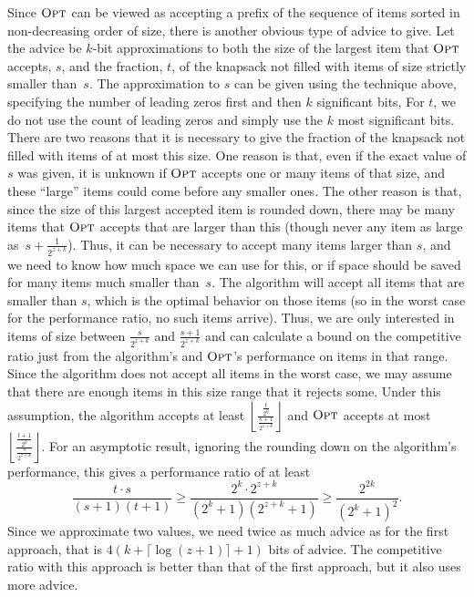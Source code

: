 \documentclass[a4paper,UKenglish,cleveref, autoref, thm-restate]{lipics-v2021}
\newcommand{\OPT}{\ensuremath{\operatorname{\textsc{Opt}}}\xspace}
\newcommand{\FLOOR}[1]{\left\lfloor#1\right\rfloor}
\begin{document}
Since \OPT can be viewed as accepting a prefix of the sequence of
items sorted in non-decreasing order of size, there is another obvious
type of advice to give.  Let the advice be $k$-bit approximations to
both the size of the largest item that \OPT accepts, $s$, and the
fraction, $t$, of the knapsack not filled with items of size strictly
smaller than~$s$. The approximation to $s$ can be given using the
technique above, specifying the number of leading zeros first and then
$k$ significant bits, For $t$, we do not use the count of leading
zeros and simply use the $k$ most significant bits.
There are two reasons that it is necessary to give
the fraction of the knapsack not filled with items of at most this
size. One reason is that,
even if the exact value of $s$ was given, it is unknown if \OPT accepts one
or many items of that size, and these ``large'' items could come before any
smaller ones. The other reason is that, since the size of this largest
accepted item is rounded
down, there may be many items that \OPT accepts that are larger than
this (though never any item as large as~$s+\frac{1}{2^{z+k}}$). Thus,
it can be necessary to accept many items larger than $s$, and we need
to know how much space we can use for this, or if space should be saved for
many items much smaller than~$s$.
The algorithm will accept all items that are smaller than $s$, which is the optimal behavior on those items (so in
the worst case for the performance ratio, no such items arrive).
Thus, we are only interested in items of size between $\frac{s}{2^{z+k}}$ and
$\frac{s+1}{2^{z+k}}$ and can calculate a bound on the competitive ratio just from the algorithm's
and \OPT's performance on items in that range. Since the algorithm does not accept all items in the
worst case, we may assume that there are enough items in this size range that it 
rejects some. Under this assumption,
the algorithm accepts at least
$\FLOOR{\frac{\frac{t}{2^k}}{\frac{s+1}{2^{z+k}}}}$ and \OPT accepts at most
$\FLOOR{\frac{\frac{t+1}{2^k}}{\frac{s}{2^{z+k}}}}$. For an asymptotic result, ignoring the rounding down on the algorithm's performance, this gives a performance
ratio of at least $$\frac{t\cdot s}{(s+1)(t+1)}\geq \frac{2^k\cdot 2^{z+k}}
{(2^k+1)(2^{z+k}+1)}\geq \frac{2^{2k}}{(2^k +1)^2}.$$
Since we approximate two values, we need twice as much advice as for the
first approach, that is
$4(k+\lceil \log (z+1)\rceil +1)$ bits of advice.
The competitive ratio with this approach is better than that of the first
approach, but it also uses more advice.
\end{document}
